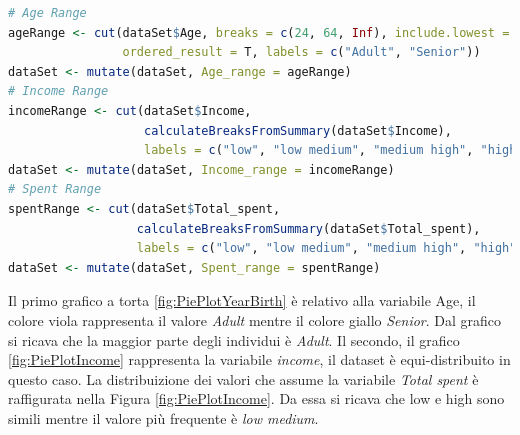 \documentclass[letterpaper,11pt]{article}
\begin{document}
\begin{lstlisting}[language=R]
# Age Range
ageRange <- cut(dataSet$Age, breaks = c(24, 64, Inf), include.lowest = T,
                ordered_result = T, labels = c("Adult", "Senior"))
dataSet <- mutate(dataSet, Age_range = ageRange)
# Income Range
incomeRange <- cut(dataSet$Income, 
                   calculateBreaksFromSummary(dataSet$Income),
                   labels = c("low", "low medium", "medium high", "high"))
dataSet <- mutate(dataSet, Income_range = incomeRange)
# Spent Range
spentRange <- cut(dataSet$Total_spent, 
                  calculateBreaksFromSummary(dataSet$Total_spent),
                  labels = c("low", "low medium", "medium high", "high"))
dataSet <- mutate(dataSet, Spent_range = spentRange)
\end{lstlisting}

Il primo grafico a torta \ref{fig:PiePlotYearBirth} è relativo alla variabile Age, il colore viola rappresenta il valore \textit{Adult} mentre il colore giallo \textit{Senior}. Dal grafico si ricava che la maggior parte degli individui è \textit{Adult}.
Il secondo, il grafico \ref{fig:PiePlotIncome} rappresenta la variabile \textit{income}, il dataset è equi-distribuito in questo caso.
La distribuizione dei valori che assume la variabile \textit{Total spent} è raffigurata nella Figura \ref{fig:PiePlotIncome}. Da essa si ricava che low e high sono simili mentre il valore più frequente è \textit{low medium}.\\
\end{document}
